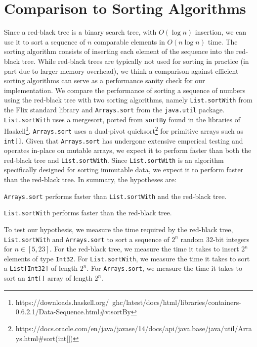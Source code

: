 \documentclass[../main.tex]{subfiles}
\begin{document}
\section{Comparison to Sorting Algorithms}

Since a red-black tree is a binary search tree, with $O(\log{n})$ insertion, we can use it to sort a sequence of $n$ comparable elements in $O(n\log{n})$ time. The sorting algorithm consists of inserting each element of the sequence into the red-black tree. While red-black trees are typically not used for sorting in practice (in part due to larger memory overhead), we think a comparison against efficient sorting algorithms can serve as a performance sanity check for our implementation. We compare the performance of sorting a sequence of numbers using the red-black tree with two sorting algorithms, namely \lstinline{List.sortWith} from the Flix standard library and \lstinline{Arrays.sort} from the \lstinline{java.util} package. \lstinline{List.sortWith} uses a mergesort, ported from \lstinline{sortBy} found in the libraries of Haskell\footnote{https://downloads.haskell.org/~ghc/latest/docs/html/libraries/containers-0.6.2.1/Data-Sequence.html#v:sortBy}. \lstinline{Arrays.sort} uses a dual-pivot quicksort\footnote{https://docs.oracle.com/en/java/javase/14/docs/api/java.base/java/util/Arrays.html#sort(int[])} for primitive arrays such as \lstinline{int[]}. Given that \lstinline{Arrays.sort} has undergone extensive emperical testing and operates in-place on mutable arrays, we expect it to perform faster than both the red-black tree and \lstinline{List.sortWith}. Since \lstinline{List.sortWith} is an algorithm specifically designed for sorting immutable data, we expect it to perform faster than the red-black tree. In summary, the hypotheses are:
\begin{hypothesis}
\lstinline{Arrays.sort} performs faster than \lstinline{List.sortWith} and the red-black tree.
\end{hypothesis}

\begin{hypothesis}
\lstinline{List.sortWith} performs faster than the red-black tree.
\end{hypothesis}

To test our hypothesis, we measure the time required by the red-black tree, \lstinline{List.sortWith} and \lstinline{Arrays.sort} to sort a sequence of $2^n$ random 32-bit integers for $n \in [5, 23]$. For the red-black tree, we measure the time it takes to insert $2^n$ elements of type \lstinline{Int32}. For \lstinline{List.sortWith}, we measure the time it takes to sort a \lstinline{List[Int32]} of length $2^n$. For \lstinline{Arrays.sort}, we measure the time it takes to sort an \lstinline{int[]} array of length $2^n$.
\end{document}
